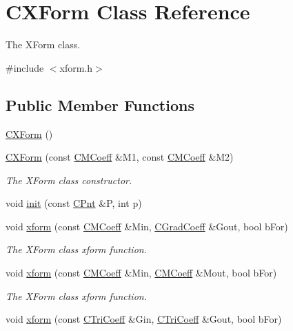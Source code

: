 \hypertarget{classCXForm}{\section{C\-X\-Form Class Reference}
\label{classCXForm}
}


The X\-Form class.  




{\ttfamily \#include $<$xform.\-h$>$}

\subsection*{Public Member Functions}
\begin{DoxyCompactItemize}
\item 
\hyperlink{classCXForm_a3079705401c30fcd28c9b6adc9fff542}{C\-X\-Form} ()
\item 
\hyperlink{classCXForm_ad2927e3f30011071f480639691c4a7fa}{C\-X\-Form} (const \hyperlink{classCMCoeff}{C\-M\-Coeff} \&M1, const \hyperlink{classCMCoeff}{C\-M\-Coeff} \&M2)
\begin{DoxyCompactList}\small\item\em The X\-Form class constructor. \end{DoxyCompactList}\item 
void \hyperlink{classCXForm_a9fe5afbc751e5d8a8d48aa20471c84a5}{init} (const \hyperlink{classCPnt}{C\-Pnt} \&P, int p)
\item 
void \hyperlink{classCXForm_aa86ee5b2fefaf70e9f914966555aa6ef}{xform} (const \hyperlink{classCMCoeff}{C\-M\-Coeff} \&Min, \hyperlink{classCGradCoeff}{C\-Grad\-Coeff} \&Gout, bool b\-For)
\begin{DoxyCompactList}\small\item\em The X\-Form class xform function. \end{DoxyCompactList}\item 
void \hyperlink{classCXForm_a1680a3a028017a27dea361e6af92f1fb}{xform} (const \hyperlink{classCMCoeff}{C\-M\-Coeff} \&Min, \hyperlink{classCMCoeff}{C\-M\-Coeff} \&Mout, bool b\-For)
\begin{DoxyCompactList}\small\item\em The X\-Form class xform function. \end{DoxyCompactList}\item 
void \hyperlink{classCXForm_a7c8028608cadb13dfa6320be661256d6}{xform} (const \hyperlink{classCTriCoeff}{C\-Tri\-Coeff} \&Gin, \hyperlink{classCTriCoeff}{C\-Tri\-Coeff} \&Gout, bool b\-For)

\end{DoxyCompactItemize}
